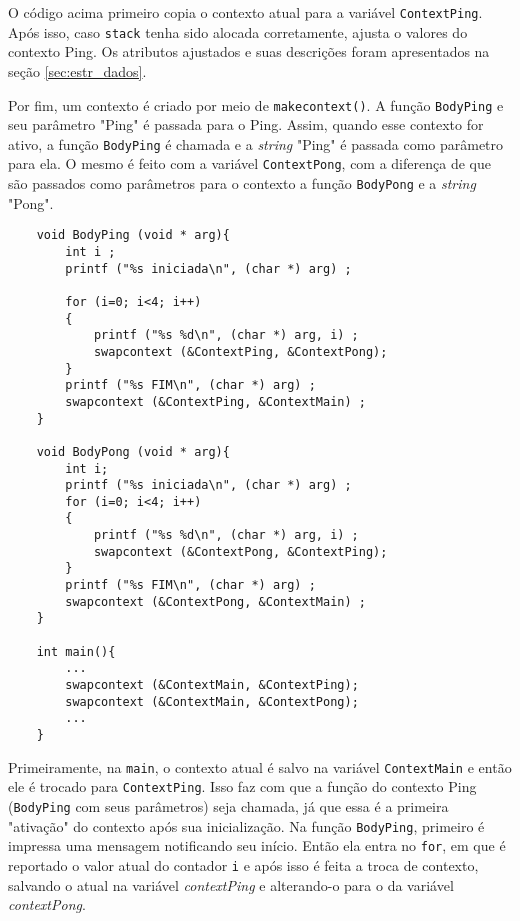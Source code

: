 \documentclass [12pt,oneside] {article}
\begin{document}
O código acima primeiro copia o contexto atual para a variável \texttt{ContextPing}. Após isso, caso \texttt{stack} tenha sido alocada corretamente, ajusta o valores do contexto Ping. Os atributos ajustados e suas descrições foram apresentados na seção \ref{sec:estr_dados}.

Por fim, um contexto é criado por meio de \texttt{makecontext()}. A função \texttt{BodyPing} e seu parâmetro "Ping" é passada para o Ping. Assim, quando esse contexto for ativo, a função \texttt{BodyPing} é chamada e a \emph{string} "Ping" é passada como parâmetro para ela. O mesmo é feito com a variável \texttt{ContextPong}, com a diferença de que são passados como parâmetros para o contexto a função \texttt{BodyPong} e a \emph{string} "Pong".


\begin{footnotesize}
	\begin{verbatim}
	void BodyPing (void * arg){
	    int i ;
	    printf ("%s iniciada\n", (char *) arg) ;
	
	    for (i=0; i<4; i++)
	    {
	        printf ("%s %d\n", (char *) arg, i) ;
	        swapcontext (&ContextPing, &ContextPong);
	    }	
	    printf ("%s FIM\n", (char *) arg) ;
	    swapcontext (&ContextPing, &ContextMain) ;
	}
	
	void BodyPong (void * arg){
	    int i;
	    printf ("%s iniciada\n", (char *) arg) ;
	    for (i=0; i<4; i++)
	    {
	        printf ("%s %d\n", (char *) arg, i) ;
	        swapcontext (&ContextPong, &ContextPing);
	    }
	    printf ("%s FIM\n", (char *) arg) ;
	    swapcontext (&ContextPong, &ContextMain) ;
	}
	
	int main(){
	    ...
	    swapcontext (&ContextMain, &ContextPing);
	    swapcontext (&ContextMain, &ContextPong);
	    ...
	}
	\end{verbatim}
\end{footnotesize}

Primeiramente, na \texttt{main}, o contexto atual é salvo na variável \texttt{ContextMain} e então ele é trocado para \texttt{ContextPing}. Isso faz com que a função do contexto Ping (\texttt{BodyPing} com seus parâmetros) seja chamada, já que essa é a primeira "ativação" do contexto após sua inicialização. Na função \texttt{BodyPing}, primeiro é impressa uma mensagem notificando seu início. Então ela entra no \texttt{for}, em que é reportado o valor atual do contador \texttt{i} e após isso é feita a troca de contexto, salvando o atual na variável \emph{contextPing} e alterando-o para o da variável \emph{contextPong}.
\end{document}
